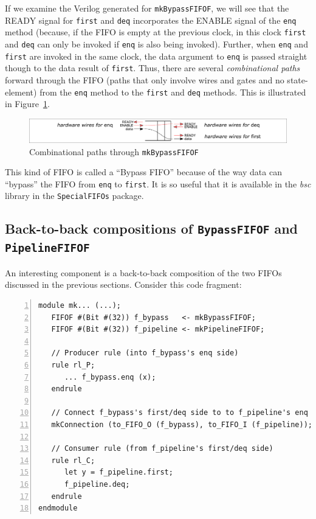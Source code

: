 If we examine the Verilog generated for \verb|mkBypassFIFOF|, we will
see that the READY signal for \verb|first| and \verb|deq| incorporates
the ENABLE signal of the \verb|enq| method (because, if the FIFO is
empty at the previous clock, in this clock \verb|first| and \verb|deq|
can only be invoked if \verb|enq| is also being invoked).  Further,
when \verb|enq| and \verb|first| are invoked in the same clock, the
data argument to \verb|enq| is passed straight though to the data
result of \verb|first|.  Thus, there are several \emph{combinational
paths} forward through the FIFO (paths that only involve wires and
gates and no state-element) from the \verb|enq| method to the
\verb|first| and \verb|deq| methods.
This is illustrated in
Figure~\ref{Fig_Combo_path_in_mkBypassFIFOF}.
\begin{figure}[htbp]
  \centerline{\includegraphics[width=6in,angle=0]{Figures/Fig_Combo_path_in_mkBypassFIFOF}}
  \caption{\label{Fig_Combo_path_in_mkBypassFIFOF}
           Combinational paths through {\tt mkBypassFIFOF}}
\end{figure}

This kind of FIFO is called a ``Bypass FIFO'' because of the way data
can ``bypass'' the FIFO from \verb|enq| to \verb|first|.  It is so
useful that it is available in the \emph{bsc} library in the
\verb|SpecialFIFOs| package.


\subsection{Back-to-back compositions of {\tt BypassFIFOF} and {\tt PipelineFIFOF}}

\label{Sec_mkBypassFIFOF_mkPipelineFIFOF}

An interesting component is a back-to-back composition of the two
FIFOs discussed in the previous sections.  Consider this code
fragment:

{\footnotesize
\begin{Verbatim}[frame=single, numbers=left]
module mk... (...);
   FIFOF #(Bit #(32)) f_bypass   <- mkBypassFIFOF;
   FIFOF #(Bit #(32)) f_pipeline <- mkPipelineFIFOF;

   // Producer rule (into f_bypass's enq side)
   rule rl_P;
      ... f_bypass.enq (x);
   endrule

   // Connect f_bypass's first/deq side to to f_pipeline's enq side
   mkConnection (to_FIFO_O (f_bypass), to_FIFO_I (f_pipeline));

   // Consumer rule (from f_pipeline's first/deq side)
   rule rl_C;
      let y = f_pipeline.first;
      f_pipeline.deq;
   endrule
endmodule
\end{Verbatim}
}

